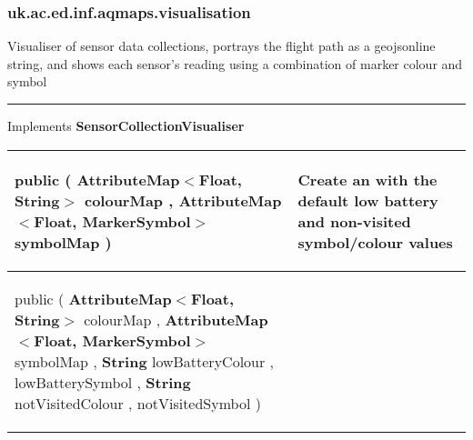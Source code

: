 \subsubsection*{ uk.ac.ed.inf.aqmaps.visualisation }
 {\scriptsize Visualiser of sensor data collections, portrays the flight path as a geojsonline string, and shows each sensor's reading using a combination of marker colour and symbol
 
\vspace*{4pt} \hrule \vspace*{3pt}
Implements \textbf{ SensorCollectionVisualiser }
\vspace*{-5pt} 
\begin{tabularx}{\linewidth}{m{}|m{}}
\label{tab:AQMapGenerator}
\begin{raggedleft}public  \textbf{\hyperref[tab:AQMapGenerator]{\color{blue}{AQMapGenerator}} }(\newline \hfill 
\hspace*{ 5pt} \textbf{AttributeMap$<$Float, String$>$} colourMap , \newline
 \hspace*{ 5pt} \textbf{AttributeMap$<$Float, MarkerSymbol$>$} symbolMap  )
\end{raggedleft} &
 Create an \hyperref[tab:AQMapGenerator]{\color{blue}{AQMapGenerator}} with the default low battery and non{-}visited symbol/colour values\\ \hline 
\begin{raggedleft}public  \textbf{\hyperref[tab:AQMapGenerator]{\color{blue}{AQMapGenerator}} }(\newline \hfill 
\hspace*{ 5pt} \textbf{AttributeMap$<$Float, String$>$} colourMap , \newline
 \hspace*{ 5pt} \textbf{AttributeMap$<$Float, MarkerSymbol$>$} symbolMap , \newline
 \hspace*{ 5pt} \textbf{String} lowBatteryColour , \newline
 \hspace*{ 5pt} \textbf{\hyperref[tab:MarkerSymbol]{\color{blue}{MarkerSymbol}}} lowBatterySymbol , \newline
 \hspace*{ 5pt} \textbf{String} notVisitedColour , \newline
 \hspace*{ 5pt} \textbf{\hyperref[tab:MarkerSymbol]{\color{blue}{MarkerSymbol}}} notVisitedSymbol  )

\end{raggedleft}
\end{tabularx}}
